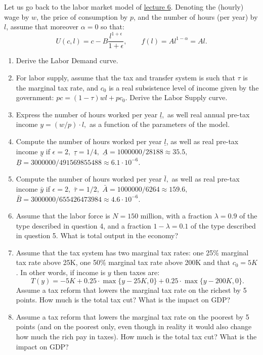 \documentclass[]{book}
\theoremstyle{definition}
\theoremstyle{definition}
\theoremstyle{definition}
\theoremstyle{remark}
\begin{document}
Let us go back to the labor market model of
\protect\hyperlink{labor-market}{lecture 6}. Denoting the (hourly) wage
by \(w\), the price of consumption by \(p\), and the number of hours
(per year) by \(l\), assume that moreover \(\alpha=0\) so that:
\[U(c, l)=c-B\frac{l^{1+\epsilon}}{1+\epsilon}, \qquad f(l)=Al^{1-\alpha} = A l.\]

\begin{enumerate}
\def\labelenumi{\arabic{enumi}.}
\item
  Derive the Labor Demand curve.
\item
  For labor supply, assume that the tax and transfer system is such that
  \(\tau\) is the marginal tax rate, and \(c_0\) is a real subsistence
  level of income given by the government: \(pc = (1-\tau)wl + p c_0\).
  Derive the Labor Supply curve.
\item
  Express the number of hours worked per year \(\underline{l},\) as well
  real annual pre-tax income \(y=(w/p) \cdot l,\) as a function of the
  parameters of the model.
\item
  Compute the number of hours worked per year \(\underline{l}\), as well
  as real pre-tax income \(\underline{y}\) if \(\epsilon = 2,\)
  \(\underline{\tau}=1/4,\)
  \(\underline{A}= 1000000/28188\approx 35.5,\)
  \(\underline{B}= 3000000/491569855488 \approx 6.1 \cdot 10^{-6}.\)
\item
  Compute the number of hours worked per year \(\bar{l},\) as well as
  real pre-tax income \(\bar{y}\) if \(\epsilon = 2,\)
  \(\bar{\tau}=1/2,\) \(\bar{A}= 1000000/6264\approx 159.6,\)
  \(\bar{B}=3000000/655426473984 \approx 4.6 \cdot 10^{-6}.\)
\item
  Assume that the labor force is \(N = 150\) million, with a fraction
  \(\lambda = 0.9\) of the type described in question 4, and a fraction
  \(1-\lambda = 0.1\) of the type described in question 5. What is total
  output in the economy?
\item
  Assume that the tax system has two marginal tax rates: one 25\%
  marginal tax rate above 25K, one 50\% marginal tax rate above 200K and
  that \(c_0=5K\). In other words, if income is \(y\) then taxes are:
  \[T(y) = -5K + 0.25\cdot \max \{ y-25K, 0 \} + 0.25\cdot \max \{ y-200K, 0 \}.\]
  Assume a tax reform that lowers the marginal tax rate on the richest
  by 5 points. How much is the total tax cut? What is the impact on GDP?
\item
  Assume a tax reform that lowers the marginal tax rate on the poorest
  by 5 points (and on the poorest only, even though in reality it would
  also change how much the rich pay in taxes). How much is the total tax
  cut? What is the impact on GDP?
\end{enumerate}
\end{document}
